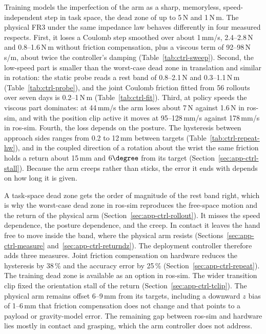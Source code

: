 Training models the imperfection of the arm as a sharp, memoryless, speed-independent step in task space, the dead zone of up to 5\,N and 1\,N\,m. The physical \ac{FR3} under the same impedance law behaves differently in four measured respects. First, it loses a Coulomb step smoothed over about 1\,mm/s, 2.4--2.8\,N and 0.8--1.6\,N\,m without friction compensation, plus a viscous term of 92--98\,N\,s/m, about twice the controller's damping (Table~\ref{tab:ctrl-sweep}). Second, the low-speed part is smaller than the worst-case dead zone in translation and similar in rotation: the static probe reads a rest band of 0.8--2.1\,N and 0.3--1.1\,N\,m (Table~\ref{tab:ctrl-probe}), and the joint Coulomb friction fitted from 56 rollouts over seven days is 0.2--1\,N\,m (Table~\ref{tab:ctrl-fit}). Third, at policy speeds the viscous part dominates: at 44\,mm/s the arm loses about 7\,N against 1.6\,N in ros-sim, and with the position clip active it moves at 95--128\,mm/s against 178\,mm/s in ros-sim. Fourth, the loss depends on the posture. The hysteresis between approach sides ranges from 0.2 to 12\,mm between targets (Table~\ref{tab:ctrl-repeat-hw}), and in the coupled direction of a rotation about the wrist the same friction holds a return about 15\,mm and $6\degree$ from its target (Section~\ref{sec:app-ctrl-stall}). Because the arm creeps rather than sticks, the error it ends with depends on how long it is given.

A task-space dead zone gets the order of magnitude of the rest band right, which is why the worst-case dead zone in ros-sim reproduces the free-space motion and the return of the physical arm (Section~\ref{sec:app-ctrl-rollout}). It misses the speed dependence, the posture dependence, and the creep. In contact it leaves the hand free to move inside the band, where the physical arm resists (Sections~\ref{sec:app-ctrl-measure} and~\ref{sec:app-ctrl-returndz}). The deployment controller therefore adds three measures. Joint friction compensation on hardware reduces the hysteresis by 38\,\% and the accuracy error by 25\,\% (Section~\ref{sec:app-ctrl-repeat}). The training dead zone is available as an option in ros-sim. The wider transition clip fixed the orientation stall of the return (Section~\ref{sec:app-ctrl-tclip}). The physical arm remains offset 6--9\,mm from its targets, including a downward $z$ bias of 1--6\,mm that friction compensation does not change and that points to a payload or gravity-model error. The remaining gap between ros-sim and hardware lies mostly in contact and grasping, which the arm controller does not address.
